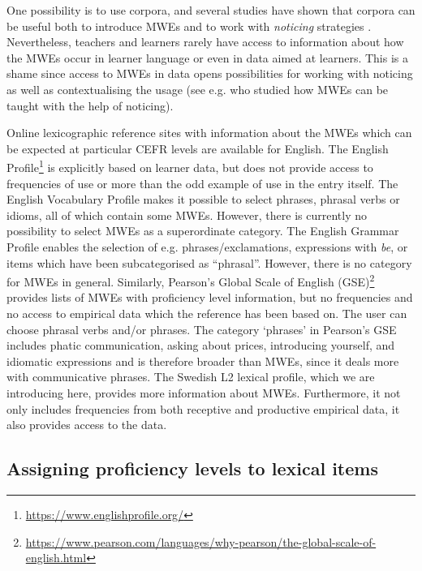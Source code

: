 \documentclass[output=paper,colorlinks,citecolor=brown]{langscibook}
\begin{document}
One possibility is to use corpora, and several studies have shown that corpora can be useful both to introduce MWEs and to work with 
\textit{noticing} \citep{schmidt2012attention} strategies \citep[cf.][]{meunier2012formulaic}. Nevertheless, teachers and learners rarely have access to information about how the MWEs occur in learner language or even in data aimed at learners. This is a shame since access to MWEs in data opens possibilities for working with noticing as well as contextualising the usage  (see e.g. \citet{boers2006formulaic} who studied how MWEs can be taught with the help of noticing).

Online lexicographic reference sites with information about the MWEs which can be expected at particular CEFR levels are available for English.
The English Profile\footnote{\url{https://www.englishprofile.org/}} \citep[][]{hawkins2012criterial,green2012language,kurtes2008english} is explicitly based on learner data, 
but does not provide access to frequencies of use or more than the odd example of use in the entry itself.
The English Vocabulary Profile \citep{capel2012completing,capel2015english} makes it possible to select phrases, phrasal verbs or idioms, all of which contain some MWEs. However, there is currently no possibility to select MWEs as a superordinate category.
The English Grammar Profile \citep[][]{okeeffe2017english} enables the selection of e.g. phrases/exclamations, expressions with \textit{be}, or items which have been subcategorised as “phrasal”. 
However, there is no category for MWEs in general. 
Similarly, Pearson’s Global Scale of English (GSE)\footnote{ \url{https://www.pearson.com/languages/why-pearson/the-global-scale-of-english.html}} provides lists of MWEs with proficiency level information, but no frequencies and no access to empirical data which the reference has been based on. The user can choose phrasal verbs and/or phrases. The category ‘phrases’ in Pearson’s GSE includes phatic communication, asking about prices, introducing yourself, and
idiomatic expressions 
and is therefore broader than MWEs, since it deals more with communicative phrases.
The Swedish L2 lexical profile, which we are introducing here, provides more information about MWEs. Furthermore, it not only includes frequencies from both receptive and productive empirical data, it also provides access to the data. 

\subsection{Assigning proficiency levels to lexical items}\label{sec:proflevels}
\end{document}
